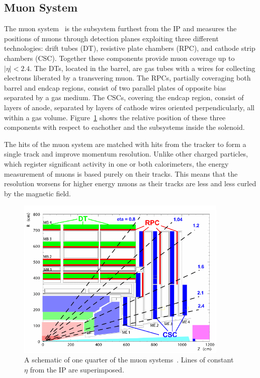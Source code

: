 \subsection{Muon System\label{subsec:muonsystem}}

The muon system~\cite{muontdr} is the subsystem furthest from the IP and measures the positions
of muons through detection planes exploiting three different technologies:
drift tubes (DT), resistive plate chambers (RPC), and cathode strip chambers (CSC).
Together these components provide muon coverage up to $|\eta|< 2.4$.
The DTs, located in the barrel, are gas tubes with a wires for collecting electrons liberated
by a transvering muon. The RPCs, partially coveraging both barrel and endcap regions, consist
of two parallel plates of opposite bias separated by a gas medium. The CSCs, covering the endcap region,
consist of layers of anode, separated by layers of cathode wires oriented perpendicularly, all
within a gas volume. Figure~\ref{fig:muonsystem} shows the relative position of these three components with respect to eachother and the subsystems inside the solenoid.

The hits of the muon system are matched with hits from the tracker to form a single track and
improve momentum resolution. Unlike other charged particles, which register significant activity in
one or both calorimeters, the energy measurement of muons is based purely on their tracks. This means
that the resolution worsens for higher energy muons as their tracks are less and less curled by
the magnetic field.


\begin{figure}[ht]
 \begin{center}
   \includegraphics[width=0.90\textwidth]{figures/experiment/muons.pdf}
      \end{center}
\caption{A schematic of one quarter of the muon systems~\cite{Chatrchyan:2008zzk}.
Lines of constant $\eta$ from the IP are superimposed.}
\label{fig:muonsystem}
\end{figure}


